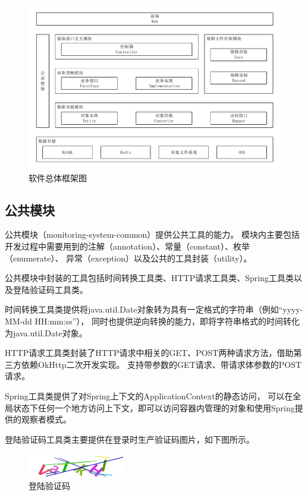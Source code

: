 \begin{figure}[ht]
    \centering
    \includegraphics[scale=.7]{./Figure/IMG_struct.pdf}
    \caption{软件总体框架图}\label{Fig:struct}
\end{figure}

\subsection{公共模块}
公共模块（monitoring-system-common）提供公共工具的能力。
模块内主要包括开发过程中需要用到的注解（annotation）、常量（constant）、枚举（enumerate）、
异常（exception）以及公共的工具封装（utility）。

公共模块中封装的工具包括时间转换工具类、HTTP请求工具类、Spring工具类以及登陆验证码工具类。

时间转换工具类提供将java.util.Date对象转为具有一定格式的字符串（例如“yyyy-MM-dd HH:mm:ss”），
同时也提供逆向转换的能力，即将字符串格式的时间转化为java.util.Date对象。

HTTP请求工具类封装了HTTP请求中相关的GET、POST两种请求方法，借助第三方依赖OkHttp二次开发实现。
支持带参数的GET请求、带请求体参数的POST请求。

Spring工具类提供了对Spring上下文的ApplicationContext的静态访问，
可以在全局状态下任何一个地方访问上下文，即可以访问容器内管理的对象和使用Spring提供的观察者模式。

登陆验证码工具类主要提供在登录时生产验证码图片，如下图所示。

\begin{figure}[ht]
    \centering
    \includegraphics[width=0.5\linewidth]{./Figure/IMG_code.png}
    \caption{登陆验证码}\label{Fig:code}
\end{figure}

